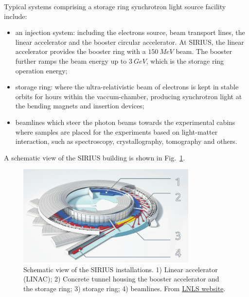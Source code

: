 Typical systems comprising a storage ring synchrotron light source facility include:
\begin{itemize}
    \item an injection system: including the electrons source, beam transport lines, the linear accelerator and the booster circular accelerator. At SIRIUS, the linear accelerator provides the booster ring with a $150~\unit{MeV}$ beam. The booster further ramps the beam energy up to $3~\unit{GeV}$, which is the storage ring operation energy;
    \item storage ring: where the ultra-relativistic beam of electrons is kept in stable orbits for hours within the vaccum-chamber, producing synchrotron light at the bending magnets and insertion devices;
    \item beamlines which steer the photon beams towards the experimental cabins where samples are placed for the experiments based on light-matter interaction, such as spectroscopy, crystallography, tomography and others.
\end{itemize}
A schematic view of the SIRIUS building is shown in Fig.~\ref{fig:sirius_layout}.
\begin{figure}[tb]
    \centering
    \includegraphics[width=0.8\textwidth]{Images/sirius_facility.png}
    \caption{Schematic view of the SIRIUS installations. 1) Linear accelerator (LINAC); 2) Concrete tunnel housing the booster accelerator and the storage ring; 3) storage ring; 4) beamlines. From \href{https://lnls.cnpem.br/sirius/como-funciona-o-sirius/}{LNLS website}.}
    \label{fig:sirius_layout}
\end{figure}

